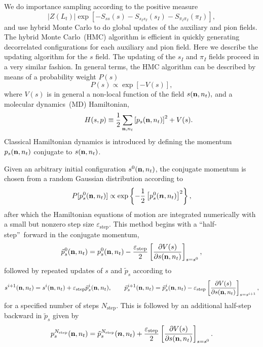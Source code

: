 We do importance sampling according to the positive measure 
\begin{equation}
|Z(L_t)|\exp{\left[-S_{ss}(s)
-S_{s_Is_I}(s_I)
-S_{\pi_I\pi_I}(\pi_I)\right]},
\end{equation} 
and use hybrid Monte Carlo to do global updates of the auxiliary and pion
fields. The hybrid Monte Carlo~(HMC) algorithm
\cite{Scalettar:1986uy,Gottlieb:1987mq,Duane:1987de} is efficient in quickly generating decorrelated configurations for
each
auxiliary and pion field.  Here we describe the
updating algorithm for the $s$ field. The updating of the $s_I$ and $\pi_I$
fields proceed in a very similar fashion.  In
general terms, the HMC algorithm can be described by means of a probability
weight $P(s)$
\begin{equation}
P(s)\propto\exp[-V(s)],
\end{equation}
where $V(s)$ is in general a non-local function of the field $s({{\bf n}%
,n_t}),$ and a molecular dynamics~(MD) Hamiltonian,
\begin{equation}
\quad\quad H(s,p)\equiv\frac{1}{2}\sum_{{\bf n},n_t%
}\left[p_s({{\bf n},n_t})\right]  ^{2}+V(s).
\end{equation}
Classical Hamiltonian dynamics is introduced by defining
the
momentum $p_s({{\bf n},n_t})$ conjugate to $s({{\bf n},n_t})$.

Given an arbitrary initial configuration $s^{0}({{\bf n},n_t})$, the
conjugate momentum is chosen from a random Gaussian distribution according
to
\begin{equation}
P[p_s^{0}({\bf n},n_t)]\propto\exp\left\{  -\frac{1}{2}\left[  p_s^{0}(\vec
{n},n_t)\right]  ^{2}\right\}  , \label{Gdistr}%
\end{equation}
after which the Hamiltonian equations of motion are integrated numerically
with a small but nonzero step size $\varepsilon_{\mathrm{step}}$.  This method begins
with a
\textquotedblleft half-step\textquotedblright\ forward in the conjugate
momentum,
\begin{equation}
\tilde{p}_s^{0}({\bf n},n_t)=p_s^{0}({\bf n},n_t)-\frac{\varepsilon
_{\mathrm{step}}}{2}\left[  \frac{\partial V(s)}{\partial s({\bf n},n_t%
)}\right]  _{s=s^{0}},
\end{equation}
followed by repeated updates of $s$ and $\tilde{p}_s$ according to
\begin{equation}
s^{i+1}({\bf n},n_t)=s^{i}({\bf n},n_t)+\varepsilon_{\mathrm{step}}%
\tilde{p}^{i}_s({\bf n},n_t),\quad\quad\tilde{p}^{i+1}_s({\bf n},n_t%
)=\tilde{p}^{i}_s({\bf n},n_t)-\varepsilon_{\mathrm{step}}\left[
\frac{\partial V(s)}{\partial s({\bf n},n_t)}\right]  _{s=s^{i+1}},
\end{equation}
for a specified number of steps $N_{\mathrm{step}}$. This is followed by an additional half-step
backward in $\tilde{p}_s$  given by
\begin{equation}
p_s^{N_{\mathrm{step}}}({\bf n},n_t)=\tilde{p}_s^{N_{\mathrm{step}}}(\vec
{n},n_t)+\frac{\varepsilon_{\mathrm{step}}}{2}\left[  \frac{\partial
V(s)}{\partial s({\bf n},n_t)}\right]  _{s=s^{0}}.
\end{equation}


